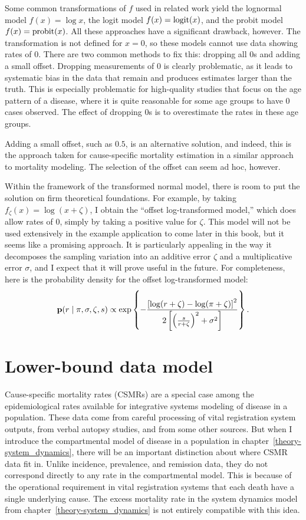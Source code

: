 Some common transformations of $f$ used in related work yield the
lognormal model $f(x) = \log x$, the logit model $f(x) = \operatorname{logit}(x)$,
and the probit model $f(x) = \operatorname{probit}(x)$.  All these approaches
have a significant drawback, however.  The transformation is not
defined for $x=0$, so these models cannot use data showing rates of
$0$. There are two common methods to fix this: dropping all $0$s
and adding a small offset.  Dropping measurements of $0$ is clearly
problematic, as it leads to systematic bias in the data that remain
and produces estimates larger than the truth.  This is especially
problematic for high-quality studies that focus on the age pattern of
a disease, where it is quite reasonable for some age groups to have
$0$ cases observed.  The effect of dropping $0$s is to overestimate
the rates in these age groups.

Adding a small offset, such as $0.5$, is an alternative solution,
and indeed, this is the approach taken for cause-specific mortality
estimation in a similar approach to mortality
modeling.\cite{girosi_demographic_2008} The selection of the offset
can seem ad hoc, however.

Within the framework of the transformed normal model, there is room to
put the solution on firm theoretical foundations.  For example, by
taking $f_\zeta(x) = \log(x + \zeta)$, I obtain the ``offset
log-transformed model,'' which does allow rates of $0$, simply by taking
a positive value for $\zeta$.  This model will not be used extensively
in the example application to come later in this book, but it seems
like a promising approach.  It is particularly appealing in the way it
decomposes the sampling variation into an additive error $\zeta$ and a
multiplicative error $\sigma$, and I expect that it will prove useful
in the future.  For completeness, here is the probability density for
the offset log-transformed model:
\[
\mathbf{p}(r\;|\; \pi, \sigma,\zeta, s)
\propto \exp\left\{
-\frac{\left[\log(r+\zeta)-\log(\pi+\zeta)\right]^2}
      {2\left[\left(\frac{s}{r+\zeta}\right)^2+\sigma^2\right]}
\right\}.
\]

\section{Lower-bound data model}
\label{theory-csmr}
Cause-specific mortality rates (CSMRs) are a special case among the
epidemiological rates available for integrative systems modeling of
disease in a population.  These data come from careful processing of
vital registration system outputs, from verbal autopsy studies, and
from some other sources. But when I introduce the compartmental model
of disease in a population in chapter~\ref{theory-system_dynamics},
there will be an important distinction about where CSMR data fit in.
Unlike incidence, prevalence, and remission data, they do not
correspond directly to any rate in the compartmental model.  This is
because of the operational requirement in vital registration systems
that each death have a single underlying cause.  The excess mortality
rate in the system dynamics model from
chapter~\ref{theory-system_dynamics} is not entirely compatible with
this idea.

